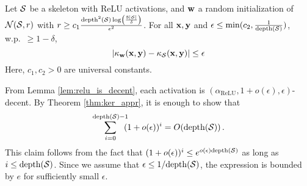 \begin{corollary}
Let ${\cal S}$ be a skeleton with ReLU activations, and ${\mathbf w}$ a random
initialization of ${\cal N}({\cal S},r)$ with $r \ge c_1 \frac{\mathrm{depth}^2({\cal S})
\log\left(\frac{8|{\cal S}|}{\delta}\right)}{\epsilon^2}$. For all ${\mathbf x},{\mathbf y}$ and
$\epsilon\le \min(c_2,\frac{1}{\mathrm{depth}({\cal S})})$, w.p.\ $\ge 1-\delta$,
	\[
	|\kappa_{\mathbf w}({\mathbf x},{\mathbf y})-\kappa_{\cal S}({\mathbf x},{\mathbf y})|\le \epsilon
	\]
	Here, $c_1,c_2>0$ are universal constants.
\end{corollary}
\proof
From Lemma \ref{lem:relu_is_decent}, each activation is
$(\alpha_{\mathrm{ReLU}},1+o(\epsilon),\epsilon)$-decent. By Theorem
\ref{thm:ker_appr}, it is enough to show that
$$\sum_{i=0}^{\mathrm{depth}({\cal S})-1}\!\!\!(1+o(\epsilon))^{i}=O(\mathrm{depth}({\cal S})) \,.$$
This claim follows from the fact that
$(1+o(\epsilon))^{i}\le e^{o(\epsilon)\mathrm{depth}({\cal S})}$ as long as
$i\le \mathrm{depth}({\cal S})$. Since we assume that
$\epsilon\le{1}/{\mathrm{depth}({\cal S})}$, the expression is bounded by $e$
for sufficiently small $\epsilon$.
\proofbox

\medskip

